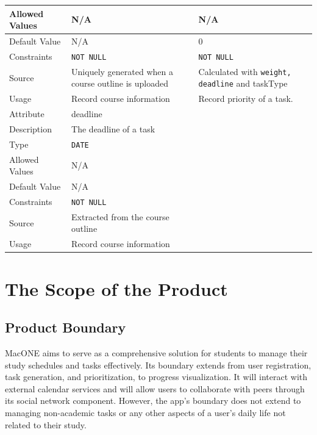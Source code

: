 \documentclass[12pt]{article}
\begin{document}
\begin{longtable}[H]{ |p{3cm}|p{5cm}|p{5cm}|  }
\hline
Allowed Values &N/A &N/A\\
\hline
Default Value &N/A &0\\
\hline
Constraints & \texttt{NOT NULL}&\texttt{NOT NULL}\\
\hline
Source & Uniquely generated when a course outline is uploaded&Calculated with \texttt{weight, deadline} and taskType\\
\hline
Usage & Record course information & Record priority of a task.\\
\hline
Attribute & deadline&\\
\hline
Description & The deadline of a task & \\
\hline
Type & \texttt{DATE}&\\
\hline
Allowed Values &N/A &\\
\hline
Default Value &N/A &\\
\hline
Constraints & \texttt{NOT NULL}&\\
\hline
Source & Extracted from the course outline&\\
\hline
Usage & Record course information & \\
\hline
\end{longtable}


\section{The Scope of the Product}

\subsection{Product Boundary}
MacONE aims to serve as a comprehensive solution for students to manage their study schedules and tasks effectively. Its boundary extends from user registration, task generation, and prioritization, to progress visualization. It will interact with external calendar services and will allow users to collaborate with peers through its social network component. However, the app’s boundary does not extend to managing non-academic tasks or any other aspects of a user’s daily life not related to their study.
\end{document}
